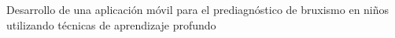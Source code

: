 \begin{center}
	\vspace*{10cm}
	{Desarrollo de una aplicación móvil
	para el prediagnóstico de bruxismo
	en niños utilizando técnicas de
	aprendizaje profundo}
	
\end{center}
